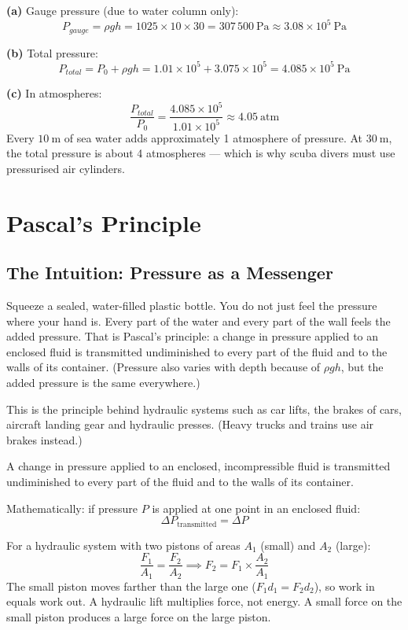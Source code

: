 \begin{solutionbox}
\textbf{(a)} Gauge pressure (due to water column only):
\[
  P_{gauge} = \rho g h
  = 1025 \times 10 \times 30
  = 307\,500\ \text{Pa} \approx 3.08\times10^5\ \text{Pa}
\]

\textbf{(b)} Total pressure:
\[
  P_{total} = P_0 + \rho g h
  = 1.01\times10^5 + 3.075\times10^5
  = 4.085\times10^5\ \text{Pa}
\]

\textbf{(c)} In atmospheres:
\[
  \frac{P_{total}}{P_0}
  = \frac{4.085\times10^5}{1.01\times10^5}
  \approx 4.05\ \text{atm}
\]
Every $10\ \text{m}$ of sea water adds approximately
1 atmosphere of pressure. At $30\ \text{m}$, the
total pressure is about 4 atmospheres --- which is
why scuba divers must use pressurised air cylinders.
\end{solutionbox}

\section{Pascal's Principle}

\subsection{The Intuition: Pressure as a Messenger}

Squeeze a sealed, water-filled plastic bottle. You do not just feel
the pressure where your hand is. Every part of the water and every
part of the wall feels the added pressure. That is Pascal's principle:
a change in pressure applied to an enclosed fluid is transmitted
undiminished to every part of the fluid and to the walls of its
container. (Pressure also varies with depth because of $\rho g h$,
but the added pressure is the same everywhere.)

This is the principle behind hydraulic systems such as car lifts,
the brakes of cars, aircraft landing gear and hydraulic presses.
(Heavy trucks and trains use air brakes instead.)

\begin{lawbox}
A change in pressure applied to an enclosed, incompressible fluid
is transmitted undiminished to every part of the fluid and to the
walls of its container.

Mathematically: if pressure $P$ is applied at one
point in an enclosed fluid:
\[
  \Delta P_{\text{transmitted}} = \Delta P
\]

For a hydraulic system with two pistons of areas
$A_1$ (small) and $A_2$ (large):
\[
  \frac{F_1}{A_1} = \frac{F_2}{A_2}
  \implies F_2 = F_1 \times \frac{A_2}{A_1}
\]
The small piston moves farther than the large one ($F_1 d_1 = F_2 d_2$),
so work in equals work out. A hydraulic lift multiplies force, not
energy.
A small force on the small piston produces a large
force on the large piston.
\end{lawbox}

